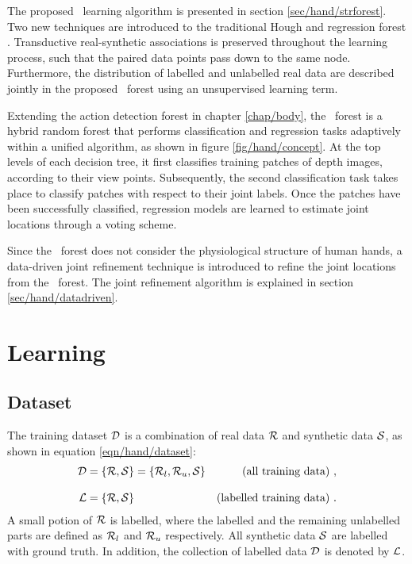 The proposed \STR\ learning algorithm is presented in section \ref{sec/hand/strforest}.
Two new techniques are introduced to the traditional Hough and regression forest \cite{Gall2011}. 
Transductive real-synthetic associations is preserved throughout the learning process, such that the paired data points pass down to the same node. 
Furthermore, the distribution of labelled and unlabelled real data are described jointly in the proposed \STR\ forest using an unsupervised learning term. 

Extending the action detection forest in chapter \ref{chap/body}, the \STR\ forest is a hybrid random forest that performs classification and regression tasks adaptively within a unified algorithm, as shown in figure \ref{fig/hand/concept}. At the top levels of each decision tree, it first classifies training patches of depth images, according to their view points. Subsequently, the second classification task takes place to classify patches with respect to their joint labels. Once the patches have been successfully classified, regression models are learned to estimate joint locations through a voting scheme.  

Since the \STR\ forest does not consider the physiological structure of human hands, a data-driven joint refinement technique is introduced to refine the joint locations from the \STR\ forest. 
The joint refinement algorithm is explained in section \ref{sec/hand/datadriven}.


\section{Learning} 

\subsection{Dataset}
\label{sec/hand/dataset} 

The training dataset $\mathcal{D}$ is a combination of real data $\mathcal{R}$ and synthetic data $\mathcal{S}$, as shown in equation \ref{eqn/hand/dataset}: 
\begin{equation}
	\label{eqn/hand/dataset} 
	\begin{aligned}
		\mathcal{D} 	& = \left\{ \mathcal{R}, \mathcal{S} \right\} = \left\{ \mathcal{R}_{l}, \mathcal{R}_{u}, \mathcal{S} \right\} & \mbox{(all training data) }, \\[3mm]
		\mathcal{L} 		& = \left\{ \mathcal{R}, \mathcal{S} \right\} & \mbox{(labelled training data) }. \\ 
	\end{aligned}
\end{equation}
A small potion of $\mathcal{R}$ is labelled, where the labelled and the remaining unlabelled parts are defined as $\mathcal{R}_{l}$ and $\mathcal{R}_{u}$ respectively. All synthetic data $\mathcal{S}$ are labelled with ground truth. In addition, the collection of labelled data $\mathcal{D}$ is denoted by $\mathcal{L}$.  

